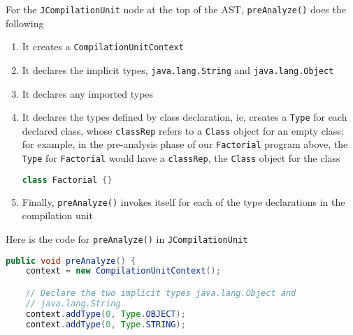 \documentclass[8pt,a4paper,compress]{beamer}
\begin{document}
\begin{frame}[fragile]
\pause

For the \lstinline{JCompilationUnit} node at the top of the AST, \lstinline{preAnalyze()} does the following
\begin{enumerate}
\item It creates a \lstinline{CompilationUnitContext}
\item It declares the implicit \jmm types, \lstinline{java.lang.String} and \lstinline{java.lang.Object}
\item It declares any imported types
\item It declares the types defined by class declaration, ie, creates a \lstinline{Type} for each declared class, whose \lstinline{classRep} refers to a \lstinline{Class} object for an empty class; for example, in the pre-analysis phase of our \lstinline{Factorial} program above, the \lstinline{Type} for \lstinline{Factorial} would have a \lstinline{classRep}, the \lstinline{Class} object for the class
\begin{lstlisting}[language=Java]
class Factorial {}
\end{lstlisting}
\item Finally, \lstinline{preAnalyze()} invokes itself for each of the type declarations in the compilation unit
\end{enumerate}

\pause
\bigskip

Here is the code for \lstinline{preAnalyze()} in \lstinline{JCompilationUnit}
\begin{lstlisting}[language=Java]
public void preAnalyze() {
    context = new CompilationUnitContext();

    // Declare the two implicit types java.lang.Object and
    // java.lang.String
    context.addType(0, Type.OBJECT);
    context.addType(0, Type.STRING);
\end{lstlisting}
\end{frame}
\end{document}
